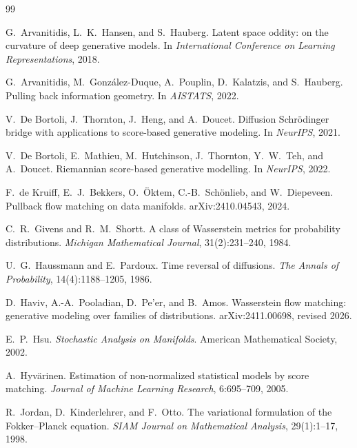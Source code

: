 \documentclass[uplatex,dvipdfmx,11pt,a4paper]{jsarticle}
\begin{document}
\begin{thebibliography}{99}

G.~Arvanitidis, L.~K.~Hansen, and S.~Hauberg.
\newblock Latent space oddity: on the curvature of deep generative models.
\newblock In \emph{International Conference on Learning Representations}, 2018.

G.~Arvanitidis, M.~Gonz\'alez-Duque, A.~Pouplin, D.~Kalatzis, and S.~Hauberg.
\newblock Pulling back information geometry.
\newblock In \emph{AISTATS}, 2022.

V.~De Bortoli, J.~Thornton, J.~Heng, and A.~Doucet.
\newblock Diffusion Schr\"odinger bridge with applications to score-based generative modeling.
\newblock In \emph{NeurIPS}, 2021.

V.~De Bortoli, E.~Mathieu, M.~Hutchinson, J.~Thornton, Y.~W.~Teh, and A.~Doucet.
\newblock Riemannian score-based generative modelling.
\newblock In \emph{NeurIPS}, 2022.

F.~de Kruiff, E.~J.~Bekkers, O.~\"Oktem, C.-B.~Sch\"onlieb, and W.~Diepeveen.
\newblock Pullback flow matching on data manifolds.
\newblock arXiv:2410.04543, 2024.

C.~R.~Givens and R.~M.~Shortt.
\newblock A class of Wasserstein metrics for probability distributions.
\newblock \emph{Michigan Mathematical Journal}, 31(2):231--240, 1984.

U.~G.~Haussmann and E.~Pardoux.
\newblock Time reversal of diffusions.
\newblock \emph{The Annals of Probability}, 14(4):1188--1205, 1986.

D.~Haviv, A.-A.~Pooladian, D.~Pe'er, and B.~Amos.
\newblock Wasserstein flow matching: generative modeling over families of distributions.
\newblock arXiv:2411.00698, revised 2026.

E.~P.~Hsu.
\newblock \emph{Stochastic Analysis on Manifolds}.
\newblock American Mathematical Society, 2002.

A.~Hyv\"arinen.
\newblock Estimation of non-normalized statistical models by score matching.
\newblock \emph{Journal of Machine Learning Research}, 6:695--709, 2005.

R.~Jordan, D.~Kinderlehrer, and F.~Otto.
\newblock The variational formulation of the Fokker--Planck equation.
\newblock \emph{SIAM Journal on Mathematical Analysis}, 29(1):1--17, 1998.


\end{thebibliography}
\end{document}
